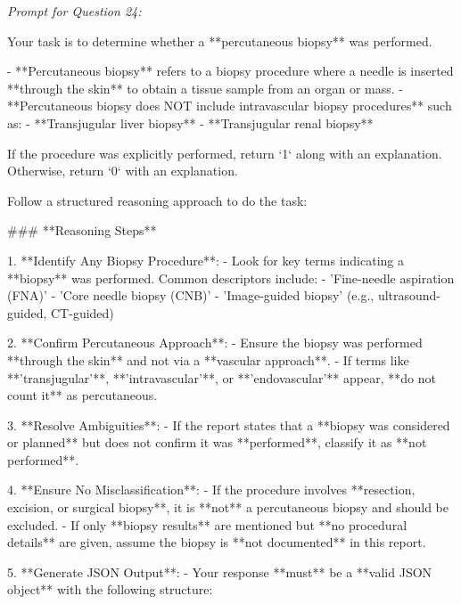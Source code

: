 \textit{\normalsize Prompt for Question  24:}
\begin{mdframed}[]
\normalsize

Your task is to determine whether a **percutaneous biopsy** was performed.  

- **Percutaneous biopsy** refers to a biopsy procedure where a needle is inserted **through the skin** to obtain a tissue sample from an organ or mass.  
- **Percutaneous biopsy does NOT include intravascular biopsy procedures** such as:  
  - **Transjugular liver biopsy**  
  - **Transjugular renal biopsy**  

If the procedure was explicitly performed, return `1` along with an explanation. Otherwise, return `0` with an explanation.

Follow a structured reasoning approach to do the task:

### **Reasoning Steps**  

1. **Identify Any Biopsy Procedure**:  
   - Look for key terms indicating a **biopsy** was performed. Common descriptors include:  
     - 'Fine-needle aspiration (FNA)'  
     - 'Core needle biopsy (CNB)'  
     - 'Image-guided biopsy' (e.g., ultrasound-guided, CT-guided)  

2. **Confirm Percutaneous Approach**:  
   - Ensure the biopsy was performed **through the skin** and not via a **vascular approach**.  
   - If terms like **'transjugular'**, **'intravascular'**, or **'endovascular'** appear, **do not count it** as percutaneous.  

3. **Resolve Ambiguities**:  
   - If the report states that a **biopsy was considered or planned** but does not confirm it was **performed**, classify it as **not performed**.  

4. **Ensure No Misclassification**:  
   - If the procedure involves **resection, excision, or surgical biopsy**, it is **not** a percutaneous biopsy and should be excluded.  
   - If only **biopsy results** are mentioned but **no procedural details** are given, assume the biopsy is **not documented** in this report.  

5. **Generate JSON Output**:  
   - Your response **must** be a **valid JSON object** with the following structure:  

\end{mdframed}

